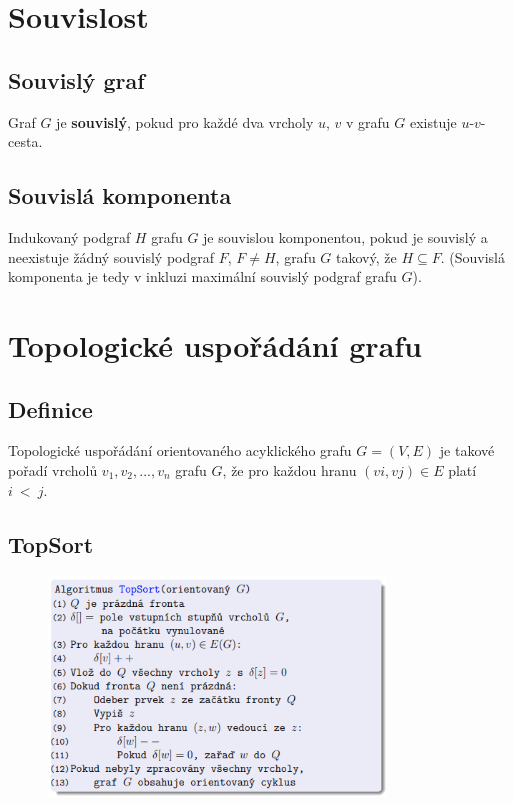 \documentclass{szzclass}
\begin{document}
\section{Souvislost}
\subsection{Souvislý graf}
Graf $G$ je \textbf{souvislý}, pokud pro každé dva vrcholy $u$, $v$ v grafu $G$ existuje $u$-$v$-cesta.

\subsection{Souvislá komponenta}
Indukovaný podgraf $H$ grafu $G$ je souvislou komponentou, pokud je souvislý a neexistuje žádný souvislý podgraf $F$, $F \neq H$, grafu $G$ takový, že $H \subseteq F$.
(Souvislá komponenta je tedy v inkluzi maximální souvislý podgraf grafu $G$).

\section{Topologické uspořádání grafu}
\subsection{Definice}
Topologické uspořádání orientovaného acyklického grafu $G = (V, E)$ je takové pořadí vrcholů $v_1, v_2, . . . , v_n$ grafu $G$, že pro každou hranu $(vi, vj) \in E$ platí $i~<~j$.

\subsection{TopSort}
\begin{figure}[h!]
\includegraphics[width=0.8\textwidth]{topics/bi-spol-4/images/topSort.png}   
\end{figure}
\end{document}
